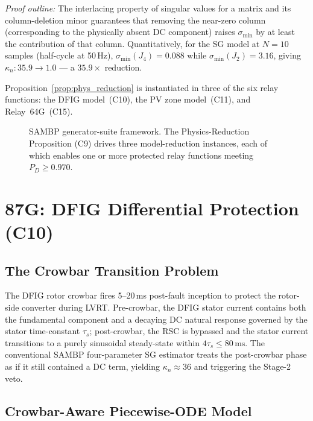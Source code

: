 \documentclass[journal,twoside]{IEEEtran}
\begin{document}
\noindent\textit{Proof outline:} The interlacing property of singular values
for a matrix and its column-deletion minor \cite{SAMBP_TR56} guarantees that
removing the near-zero column (corresponding to the physically absent DC
component) raises $\sigma_{\min}$ by at least the contribution of that column.
Quantitatively, for the SG model at $N = 10$ samples (half-cycle at 50\,Hz),
$\sigma_{\min}(J_4) = 0.088$ while $\sigma_{\min}(J_2) = 3.16$, giving
$\kappa_n: 35.9 \to 1.0$ --- a $35.9\times$ reduction.

Proposition~\ref{prop:phys_reduction} is instantiated in three of the six
relay functions: the DFIG model~(C10), the PV zone model~(C11), and
Relay~64G~(C15).

\begin{figure}[t]
  \centering
  
  \caption{SAMBP generator-suite framework. The Physics-Reduction Proposition
    (C9) drives three model-reduction instances, each of which enables one or
    more protected relay functions meeting $P_D \geq 0.970$.}
  \label{fig:architecture}
\end{figure}

\section{87G: DFIG Differential Protection (C10)}
\label{sec:87g}

\subsection{The Crowbar Transition Problem}

The DFIG rotor crowbar fires 5--20\,ms post-fault inception to protect the
rotor-side converter during LVRT.
Pre-crowbar, the DFIG stator current contains both the fundamental component
and a decaying DC natural response governed by the stator time-constant
$\tau_s$; post-crowbar, the RSC is bypassed and the stator current transitions
to a purely sinusoidal steady-state within $4\tau_s \leq 80\,\text{ms}$.
The conventional SAMBP four-parameter SG estimator treats the post-crowbar
phase as if it still contained a DC term, yielding $\kappa_n \approx 36$ and
triggering the Stage-2 veto.

\subsection{Crowbar-Aware Piecewise-ODE Model}
\label{sec:dfig_model}
\end{document}
